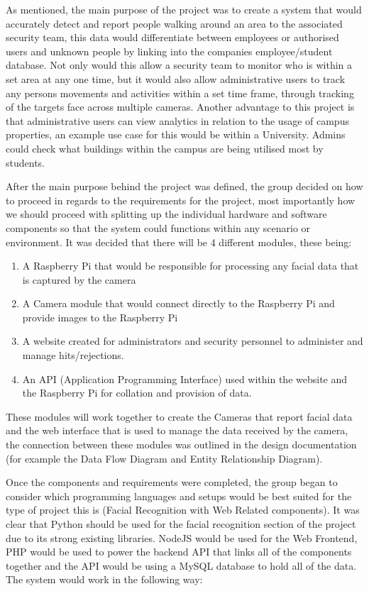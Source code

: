 \documentclass[
  english,
  a4paper,
,tablecaptionabove
]{scrartcl}
\providecommand{\tightlist}{%
  \setlength{\itemsep}{0pt}\setlength{\parskip}{0pt}}
\begin{document}
As mentioned, the main purpose of the project was to create a system
that would accurately detect and report people walking around an area to
the associated security team, this data would differentiate between
employees or authorised users and unknown people by linking into the
companies employee/student database. Not only would this allow a
security team to monitor who is within a set area at any one time, but
it would also allow administrative users to track any persons movements
and activities within a set time frame, through tracking of the targets
face across multiple cameras. Another advantage to this project is that
administrative users can view analytics in relation to the usage of
campus properties, an example use case for this would be within a
University. Admins could check what buildings within the campus are
being utilised most by students.

After the main purpose behind the project was defined, the group decided
on how to proceed in regards to the requirements for the project, most
importantly how we should proceed with splitting up the individual
hardware and software components so that the system could functions
within any scenario or environment. It was decided that there will be 4
different modules, these being:

\begin{enumerate}
\def\labelenumi{\arabic{enumi}.}
\tightlist
\item
  A Raspberry Pi that would be responsible for processing any facial
  data that is captured by the camera
\item
  A Camera module that would connect directly to the Raspberry Pi and
  provide images to the Raspberry Pi
\item
  A website created for administrators and security personnel to
  administer and manage hits/rejections.
\item
  An API (Application Programming Interface) used within the website and
  the Raspberry Pi for collation and provision of data.
\end{enumerate}

These modules will work together to create the Cameras that report
facial data and the web interface that is used to manage the data
received by the camera, the connection between these modules was
outlined in the design documentation (for example the Data Flow Diagram
and Entity Relationship Diagram).

Once the components and requirements were completed, the group began to
consider which programming languages and setups would be best suited for
the type of project this is (Facial Recognition with Web Related
components). It was clear that Python should be used for the facial
recognition section of the project due to its strong existing libraries.
NodeJS would be used for the Web Frontend, PHP would be used to power
the backend API that links all of the components together and the API
would be using a MySQL database to hold all of the data. The system
would work in the following way:
\end{document}

